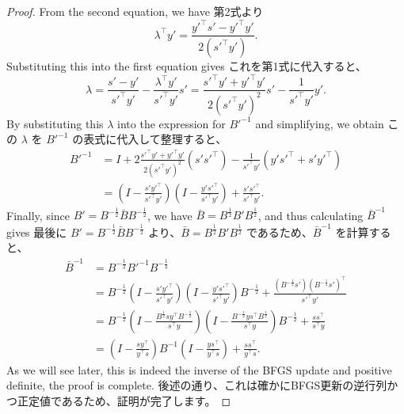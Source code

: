 \documentclass[0_main]{subfiles}
\begin{document}
\begin{proof}
    \ifEn
        From the second equation, we have
    \else
        第2式より
    \fi
    \begin{equation*}
        \lambda^\top y' = \frac{y'^\top s'-y'^\top y'}{2(s'^\top y')}.
    \end{equation*}
    \ifEn
        Substituting this into the first equation gives
    \else
        これを第1式に代入すると、
    \fi
    \begin{equation*}
        \lambda = \frac{s'-y'}{s'^\top y'} - \frac{\lambda^\top y'}{s'^\top y'}s' = \frac{s'^\top y'+y'^\top y'}{2(s'^\top y')^2}s' -\frac{1}{s'^\top y'}y'.
    \end{equation*}
    \ifEn
        By substituting this $\lambda$ into the expression for $B'^{-1}$ and simplifying, we obtain
    \else
        この $\lambda$ を $B'^{-1}$ の表式に代入して整理すると、
    \fi
    \begin{align*}
        B'^{-1} & = I + 2\frac{s'^\top y'+y'^\top y'}{2(s'^\top y')^2}(s' s'^\top) - \frac{1}{s'^\top y'}(y' s'^\top + s' y'^\top)             \\
                & = \left( I-\frac{s'y'^\top}{s'^\top y'} \right) \left( I-\frac{y's'^\top}{s'^\top y'} \right) +\frac{s's'^\top}{s'^\top y'}.
    \end{align*}
    \ifEn
        Finally, since $B' = B^{-\frac{1}{2}} \bar{B} B^{-\frac{1}{2}}$, we have $\bar{B} = B^{\frac{1}{2}} B' B^{\frac{1}{2}}$, and thus calculating $\bar{B}^{-1}$ gives
    \else
        最後に $B' = B^{-\frac{1}{2}} \bar{B} B^{-\frac{1}{2}}$ より、$\bar{B} = B^{\frac{1}{2}} B' B^{\frac{1}{2}}$ であるため、$\bar{B}^{-1}$ を計算すると、
    \fi
    \begin{align*}
        \bar{B}^{-1} & = B^{-\frac{1}{2}} B'^{-1} B^{-\frac{1}{2}}                                                                                                                                                                          \\
                     & = B^{-\frac{1}{2}} \left( I-\frac{s'y'^\top}{s'^\top y'} \right) \left( I-\frac{y's'^\top}{s'^\top y'} \right) B^{-\frac{1}{2}} + \frac{(B^{-\frac{1}{2}}s')(B^{-\frac{1}{2}}s')^\top}{s'^\top y'}                   \\
                     & = B^{-\frac{1}{2}} \left( I-\frac{B^{\frac{1}{2}}s y^\top B^{-\frac{1}{2}}}{s^\top y} \right) \left( I-\frac{B^{-\frac{1}{2}}y s^\top B^{\frac{1}{2}}}{s^\top y} \right) B^{-\frac{1}{2}} + \frac{ss^\top}{s^\top y} \\
                     & = \left( I - \frac{s y^\top}{y^\top s} \right) B^{-1} \left( I - \frac{y s^\top}{y^\top s} \right) + \frac{s s^\top}{y^\top s}.
    \end{align*}
    \ifEn
        As we will see later, this is indeed the inverse of the BFGS update and positive definite, the proof is complete.
    \else
        後述の通り、これは確かにBFGS更新の逆行列かつ正定値であるため、証明が完了します。
    \fi
    \myQED
\end{proof}
\end{document}
